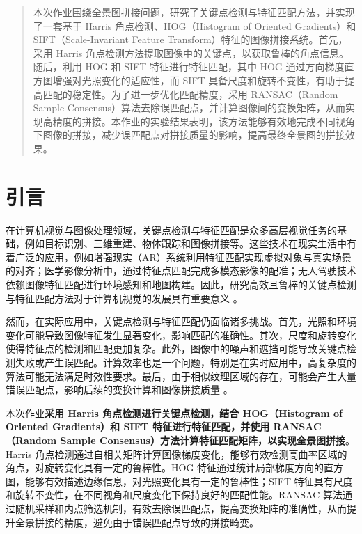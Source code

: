 \documentclass[a4paper, utf8]{ctexart}
\begin{document}
	\maketitle
	
	\renewcommand{\abstractname}{\large \textbf{摘要}}
	\begin{abstract}
		本次作业围绕全景图拼接问题，研究了关键点检测与特征匹配方法，并实现了一套基于 Harris 角点检测、HOG（Histogram of Oriented Gradients）和 SIFT（Scale-Invariant Feature Transform）特征的图像拼接系统。首先，采用 Harris 角点检测方法提取图像中的关键点，以获取鲁棒的角点信息。随后，利用 HOG 和 SIFT 特征进行特征匹配，其中 HOG 通过方向梯度直方图增强对光照变化的适应性，而 SIFT 具备尺度和旋转不变性，有助于提高匹配的稳定性。为了进一步优化匹配精度，采用 RANSAC（Random Sample Consensus）算法去除误匹配点，并计算图像间的变换矩阵，从而实现高精度的拼接。本作业的实验结果表明，该方法能够有效地完成不同视角下图像的拼接，减少误匹配点对拼接质量的影响，提高最终全景图的拼接效果。
		
	\end{abstract}
	
	\section{引言}
	
	在计算机视觉与图像处理领域，关键点检测与特征匹配是众多高层视觉任务的基础，例如目标识别、三维重建、物体跟踪和图像拼接等。这些技术在现实生活中有着广泛的应用，例如增强现实（AR）系统利用特征匹配实现虚拟对象与真实场景的对齐；医学影像分析中，通过特征点匹配完成多模态影像的配准；无人驾驶技术依赖图像特征匹配进行环境感知和地图构建。因此，研究高效且鲁棒的关键点检测与特征匹配方法对于计算机视觉的发展具有重要意义 \cite{dip} 。​
	
	然而，在实际应用中，关键点检测与特征匹配仍面临诸多挑战。首先，光照和环境变化可能导致图像特征发生显著变化，影响匹配的准确性。其次，尺度和旋转变化使得特征点的检测和匹配更加复杂。此外，图像中的噪声和遮挡可能导致关键点检测失败或产生误匹配。计算效率也是一个问题，特别是在实时应用中，高复杂度的算法可能无法满足时效性要求。最后，由于相似纹理区域的存在，可能会产生大量错误匹配点，影响后续的变换计算和图像拼接质量 \cite{dip} 。​
	
	本次作业\textbf{采用 Harris 角点检测进行关键点检测，结合 HOG（Histogram of Oriented Gradients）和 SIFT 特征进行特征匹配，并使用 RANSAC（Random Sample Consensus）方法计算特征匹配矩阵，以实现全景图拼接}。Harris 角点检测通过自相关矩阵计算图像梯度变化，能够有效检测高曲率区域的角点，对旋转变化具有一定的鲁棒性。HOG 特征通过统计局部梯度方向的直方图，能够有效描述边缘信息，对光照变化具有一定的鲁棒性；SIFT 特征具有尺度和旋转不变性，在不同视角和尺度变化下保持良好的匹配性能。RANSAC 算法通过随机采样和内点筛选机制，有效去除误匹配点，提高变换矩阵的准确性，从而提升全景拼接的精度，避免由于错误匹配点导致的拼接畸变。
	
\end{document}
